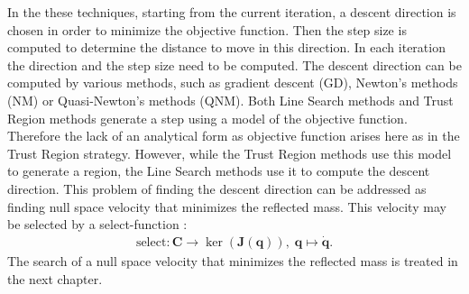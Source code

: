 In the these techniques, starting from the current iteration, a descent direction is chosen in order to minimize the objective function. Then the step size is computed to determine the distance to move in this direction. In each iteration the direction and the step size need to be computed. The descent direction can be computed by various methods, such as gradient descent (GD), Newton's methods (NM) or Quasi-Newton's methods (QNM). %
Both Line Search methods and Trust Region methods generate a step using a model of the objective function. Therefore the lack of an analytical form as objective function arises here as in the Trust Region strategy.
However, while the Trust Region methods use this model to generate a region, the Line Search methods use it to compute the descent direction.  
This problem of finding the descent direction can be addressed as finding null space velocity that minimizes the reflected mass. This velocity may be selected by a  select-function :
%
\begin{align}
\text{select}: \mathbf{C}\rightarrow\ker(\mathbf{J}(\mathbf{q})),\; \mathbf{q}\mapsto\dot{\mathbf{q}} .
\end{align}
%
 The search of a null space velocity that minimizes the reflected mass is treated in the next chapter. 








